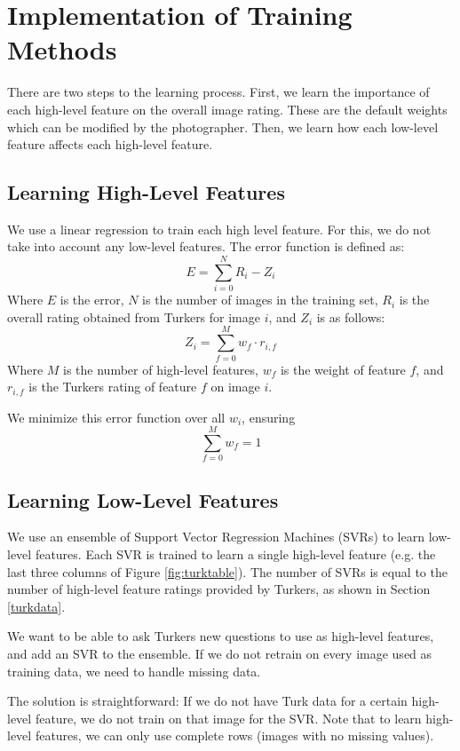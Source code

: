 \documentclass[11pt,letter]{article}
\begin{document}
\section{Implementation of Training Methods}
\label{methods}

There are two steps to the learning process. First, we learn the importance of each high-level feature on the overall image rating. These are the default weights which can be modified by the photographer. Then, we learn how each low-level feature affects each high-level feature.

\subsection{Learning High-Level Features}
We use a linear regression to train each high level feature. For this, we do not take into account any low-level features. The error function is defined as:
\[
E=\displaystyle\sum\limits_{i=0}^N R_i-Z_i
\]
Where $E$ is the error, $N$ is the number of images in the training set, $R_i$ is the overall rating obtained from Turkers for image $i$, and $Z_i$ is as follows:
\[
Z_i=\displaystyle\sum\limits_{f=0}^M w_f \cdot r_{i,f}
\]
Where $M$ is the number of high-level features, $w_f$ is the weight of feature $f$, and $r_{i,f}$ is the Turkers rating of feature $f$ on image $i$.

We minimize this error function over all $w_i$, ensuring
\[
\displaystyle\sum\limits_{f=0}^M w_f = 1
\]



\subsection{Learning Low-Level Features}
\label{llfeat}
We use an ensemble of Support Vector Regression Machines (SVRs) to learn low-level features. Each SVR is trained to learn a single high-level feature (e.g. the last three columns of Figure \ref{fig:turktable}). The number of SVRs is equal to the number of high-level feature ratings provided by Turkers, as shown in Section \ref{turkdata}.

We want to be able to ask Turkers new questions to use as high-level features, and add an SVR to the ensemble. If we do not retrain on every image used as training data, we need to handle missing data.

The solution is straightforward: If we do not have Turk data for a certain high-level feature, we do not train on that image for the SVR. Note that to learn high-level features, we can only use complete rows (images with no missing values).
\end{document}
